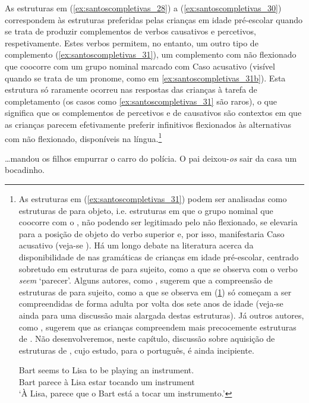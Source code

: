 \documentclass[output=paper]{LSP/langsci}
\begin{document}
As estruturas em (\ref{ex:santoscompletivas_28}) a (\ref{ex:santoscompletivas_30}) correspondem às estruturas preferidas pelas crianças em idade pré-escolar quando se trata de produzir complementos de verbos causativos e percetivos, respetivamente. Estes verbos permitem, no entanto, um outro tipo de complemento (\ref{ex:santoscompletivas_31}), um complemento com  não flexionado que coocorre com um grupo nominal marcado com Caso acusativo (visível quando se trata de um pronome, como em \ref{ex:santoscompletivas_31b}). Esta estrutura só raramente ocorreu nas respostas das crianças à tarefa de completamento (os casos como \ref{ex:santoscompletivas_31} são raros), o que significa que os complementos de percetivos e de causativos são contextos em que as crianças parecem efetivamente preferir infinitivos flexionados às alternativas com  não flexionado, disponíveis na língua.\footnote{
As estruturas em (\ref{ex:santoscompletivas_31}) podem ser analisadas como estruturas de  para objeto, i.e. estruturas em que o grupo nominal que coocorre com o , não podendo ser legitimado pelo  não flexionado, se elevaria para a posição de objeto do verbo superior e, por isso, manifestaria Caso acusativo (veja-se \citet{santos_etal2016}). Há um longo debate na literatura acerca da disponibilidade de  nas gramáticas de crianças em idade pré-escolar, centrado sobretudo em estruturas de  para sujeito, como a que se observa com o verbo \textit{seem} ‘parecer’. Alguns autores, como \citet{hirschwexler2007}, sugerem que a compreensão de estruturas de  para sujeito, como a que se observa em (\ref{ex:santoscompletivas_i2}) só começam a ser compreendidas de forma adulta por volta dos sete anos de idade (veja-se ainda\citet{orfitelli2012} para uma discussão mais alargada destas estruturas). Já outros autores, como \citet{becker2005}, sugerem que as crianças compreendem mais precocemente estruturas de . Não desenvolveremos, neste capítulo, discussão sobre aquisição de estruturas de , cujo estudo, para o português, é ainda incipiente.

\ea\label{ex:santoscompletivas_i2}
\gll Bart seems to Lisa {to be} playing an instrument.\\ 
Bart parece à Lisa  estar tocando um instrument\\
\glt ‘À Lisa, parece que o Bart está a tocar um instrumento.’
\z
}

\ea\label{ex:santoscompletivas_31}
\ea\label{ex:santoscompletivas_31a} \ldots mandou os filhos empurrar o carro do polícia.
\ex\label{ex:santoscompletivas_31b} O pai deixou-\textit{os} sair da casa um bocadinho.
\zl
\end{document}
